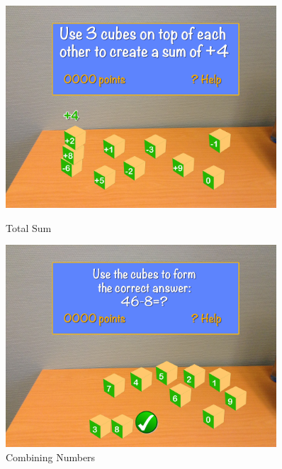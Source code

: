 \begin{figure}[h]
	\centering
	\begin{minipage}{.5\textwidth}
		\capstart
		\centering
		\includegraphics[width=0.9\textwidth]{images/Costas/game_mockup2(arithmetic).jpg}
		\vspace{-10pt}
		\caption{Total Sum}
		\label{fig:Costas_total_sum}
	\end{minipage}%
	\begin{minipage}{.5\textwidth}
		\capstart
		\centering
		\includegraphics[width=0.9\textwidth]{images/Costas/game_mockup2(arithmetic2).jpg}
		\vspace{-10pt}
		\caption{Combining Numbers}
		\label{fig:Costas_combining_numbers}
	\end{minipage}%
\end{figure}

